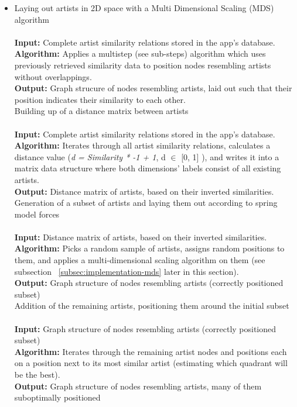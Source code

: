 \begin{itemize}
	\item Laying out artists in 2D space with a Multi Dimensional Scaling (MDS) algorithm \\\\
			\textbf{Input:} Complete artist similarity relations stored in the app's database.   \\
			\textbf{Algorithm:} Applies a multistep (see sub-steps) algorithm which uses previously
			retrieved similarity data to position nodes resembling artists without overlappings.  \\
			\textbf{Output:} Graph strucure of nodes resembling artists, laid out such that their position 
			indicates their similarity to each other. \\
			
		\subitem Building up of a distance matrix between artists \\\\
				\textbf{Input:} Complete artist similarity relations stored in the app's database. \\
				\textbf{Algorithm:} Iterates through all artist similarity relations, calculates a
				distance value (\emph{d = Similarity * -1 + 1}, d $\in$ [0, 1] ), and writes it into
				a matrix data structure where both dimensions' labels consist of all existing artists. \\
				\textbf{Output:} Distance matrix of artists, based on their inverted similarities. \\
				
		\subitem Generation of a subset of artists and laying them out according to spring model forces	\\\\
				\textbf{Input:} Distance matrix of artists, based on their inverted similarities. \\
				\textbf{Algorithm:} Picks a random sample of artists, assigns random positions to them,
				and applies a multi-dimensional scaling algorithm on them (see subsection 
				~\ref{subsec:implementation-mds} later in this section). \\
				\textbf{Output:} Graph structure of nodes resembling artists (correctly positioned subset) \\
				
		\subitem Addition of the remaining artists, positioning them around the initial subset \\\\
				\textbf{Input:} Graph structure of nodes resembling artists (correctly positioned subset) \\
				\textbf{Algorithm:} Iterates through the remaining artist nodes and positions each on a position
				next to its most similar artist (estimating which quadrant will be the best). \\
				\textbf{Output:} Graph structure of nodes resembling artists, many of them suboptimally positioned \\
				

\end{itemize}
